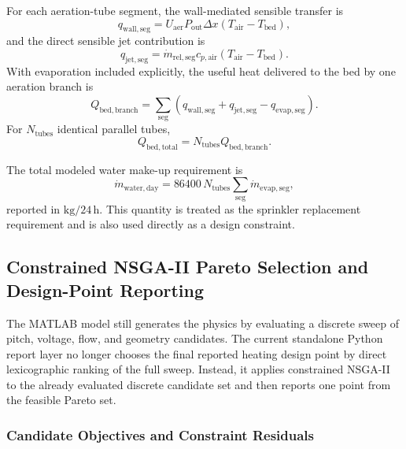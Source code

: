 \documentclass{article}
\begin{document}
For each aeration-tube segment, the wall-mediated sensible transfer is
\begin{equation}
q_{\mathrm{wall,seg}}
= U_{\mathrm{aer}} P_{\mathrm{out}} \Delta x
(T_{\mathrm{air}} - T_{\mathrm{bed}}),
\end{equation}
and the direct sensible jet contribution is
\begin{equation}
q_{\mathrm{jet,seg}}
= \dot{m}_{\mathrm{rel,seg}} c_{p,\mathrm{air}}
(T_{\mathrm{air}} - T_{\mathrm{bed}}).
\end{equation}
With evaporation included explicitly, the useful heat delivered to the bed by
one aeration branch is
\begin{equation}
Q_{\mathrm{bed,branch}}
= \sum_{\mathrm{seg}}
\left(
q_{\mathrm{wall,seg}} +
q_{\mathrm{jet,seg}} -
q_{\mathrm{evap,seg}}
\right).
\end{equation}
For $N_{\mathrm{tubes}}$ identical parallel tubes,
\begin{equation}
Q_{\mathrm{bed,total}}
= N_{\mathrm{tubes}} Q_{\mathrm{bed,branch}}.
\end{equation}

The total modeled water make-up requirement is
\begin{equation}
\dot{m}_{\mathrm{water,day}}
= 86400\,
N_{\mathrm{tubes}}
\sum_{\mathrm{seg}}
\dot{m}_{\mathrm{evap,seg}},
\end{equation}
reported in $\mathrm{kg/24\,h}$. This quantity is treated as the sprinkler
replacement requirement and is also used directly as a design constraint.

\subsection{Constrained NSGA-II Pareto Selection and Design-Point Reporting}

The MATLAB model still generates the physics by evaluating a discrete sweep of
pitch, voltage, flow, and geometry candidates. The current standalone Python
report layer no longer chooses the final reported heating design point by
direct lexicographic ranking of the full sweep. Instead, it applies
constrained NSGA-II to the already evaluated discrete candidate set and then
reports one point from the feasible Pareto set.

\subsubsection{Candidate Objectives and Constraint Residuals}
\end{document}

